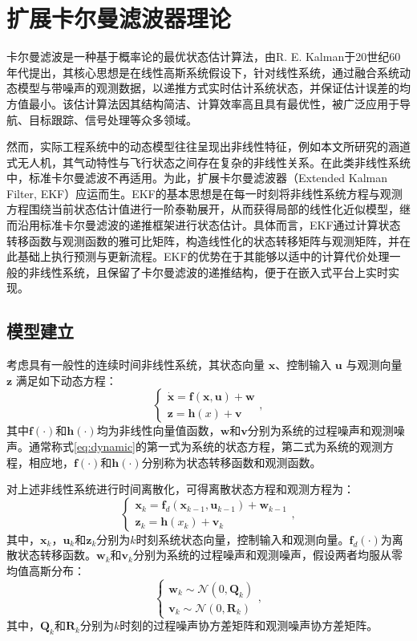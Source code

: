 \section{扩展卡尔曼滤波器理论}%
卡尔曼滤波是一种基于概率论的最优状态估计算法，由R. E. Kalman于20世纪60年代提出，其核心思想是在线性高斯系统假设下，针对线性系统，通过融合系统动态模型与带噪声的观测数据，以递推方式实时估计系统状态，并保证估计误差的均方值最小。该估计算法因其结构简洁、计算效率高且具有最优性，被广泛应用于导航、目标跟踪、信号处理等众多领域。

然而，实际工程系统中的动态模型往往呈现出非线性特征，例如本文所研究的涵道式无人机，其气动特性与飞行状态之间存在复杂的非线性关系。在此类非线性系统中，标准卡尔曼滤波不再适用。为此，扩展卡尔曼滤波器（Extended Kalman Filter, EKF）应运而生。EKF的基本思想是在每一时刻将非线性系统方程与观测方程围绕当前状态估计值进行一阶泰勒展开，从而获得局部的线性化近似模型，继而沿用标准卡尔曼滤波的递推框架进行状态估计。具体而言，EKF通过计算状态转移函数与观测函数的雅可比矩阵，构造线性化的状态转移矩阵与观测矩阵，并在此基础上执行预测与更新流程。EKF的优势在于其能够以适中的计算代价处理一般的非线性系统，且保留了卡尔曼滤波的递推结构，便于在嵌入式平台上实时实现。
\subsection{模型建立}
考虑具有一般性的连续时间非线性系统，其状态向量 $\bm{x}$、控制输入 $\bm{u}$ 与观测向量 $\bm{z}$ 满足如下动态方程：
\begin{equation}
    \begin{cases}
        \dot{\bm{x}} = \bm{f}(\bm{x}, \bm{u}) + \bm{w}\\
        \bm{z} = \bm{h}(x) + \bm{v}
        \label{eq:dynamic}
    \end{cases},
\end{equation}
其中$\bm{f}(\cdot)$和$\bm{h}(\cdot)$均为非线性向量值函数，$\bm{w}$和$\bm{v}$分别为系统的过程噪声和观测噪声。通常称式\eqref{eq:dynamic}的第一式为系统的状态方程，第二式为系统的观测方程，相应地，$\bm{f}(\cdot)$和$\bm{h}(\cdot)$分别称为状态转移函数和观测函数。

对上述非线性系统进行时间离散化，可得离散状态方程和观测方程为：
\begin{equation}
    \begin{cases}
        \bm{x}_k = \bm{f}_d(\bm{x}_{k-1}, \bm{u}_{k-1}) + \bm{w}_{k-1}\\
        \bm{z}_k = \bm{h}(x_{k}) + \bm{v}_k
    \end{cases},
\end{equation}
其中，$\bm{x}_k$，$\bm{u}_k$和$\bm{z}_k$分别为$k$时刻系统状态向量，控制输入和观测向量。$\bm{f}_d(\cdot)$为离散状态转移函数。$\bm{w}_k$和$\bm{v}_k$分别为系统的过程噪声和观测噪声，假设两者均服从零均值高斯分布：
\begin{equation}
    \begin{cases}
        \bm{w}_k \sim \mathcal{N}(0, \bm{Q}_k)\\
        \bm{v}_k \sim \mathcal{N}(0, \bm{R}_k)
    \end{cases},
\end{equation}
其中，$\bm{Q}_k$和$\bm{R}_k$分别为$k$时刻的过程噪声协方差矩阵和观测噪声协方差矩阵。

